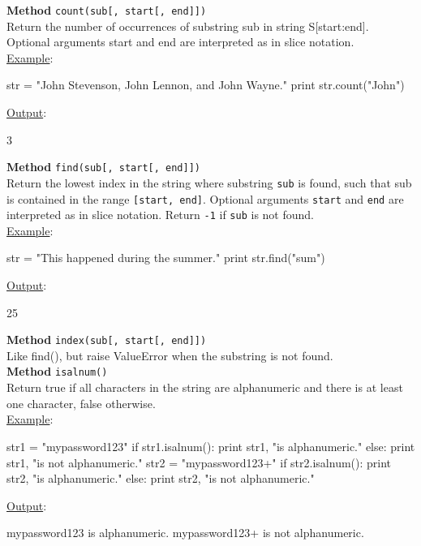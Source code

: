 \noindent
{\bf Method} {\tt count(sub[, start[, end]])}\\

\noindent
Return the number of occurrences of substring sub in string S[start:end]. 
Optional arguments start and end are interpreted as in slice notation.\\

\noindent
\underline{Example}:
\begin{bluecode}
str = "John Stevenson, John Lennon, and John Wayne."
print str.count("John")
\end{bluecode}
\underline{Output}:
\begin{greencode}
3
\end{greencode}
\vspace{4mm}

\noindent
{\bf Method} {\tt find(sub[, start[, end]])}\\

\noindent
Return the lowest index in the string where substring {\tt sub} is found, such that 
sub is contained in the range {\tt [start, end]}. Optional arguments {\tt start} and {\tt end} 
are interpreted as in slice notation. Return {\tt -1} if {\tt sub} is not found.\\

\noindent
\underline{Example}:
\begin{bluecode}
str = "This happened during the summer."
print str.find("sum")
\end{bluecode}
\underline{Output}:
\begin{greencode}
25
\end{greencode}
\vspace{4mm}

\noindent
{\bf Method} {\tt index(sub[, start[, end]])}\\

\noindent
Like find(), but raise ValueError when the substring is not found.\\

\noindent
{\bf Method} {\tt isalnum()}\\

\noindent
Return true if all characters in the string are alphanumeric and 
there is at least one character, false otherwise.\\

\noindent
\underline{Example}:
\begin{bluecode}
str1 = "mypassword123"
if str1.isalnum():
    print str1, "is alphanumeric."
else: 
    print str1, "is not alphanumeric."
str2 = "mypassword123+"
if str2.isalnum():
    print str2, "is alphanumeric."
else: 
    print str2, "is not alphanumeric."
\end{bluecode}
\underline{Output}:
\begin{greencode}
mypassword123 is alphanumeric.
mypassword123+ is not alphanumeric.
\end{greencode}
\vspace{4mm}

